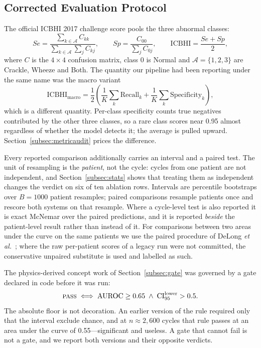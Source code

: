 \documentclass[journal,onecolumn]{IEEEtran}
\begin{document}
\subsection{Corrected Evaluation Protocol}
\label{subsec:protocol}

The official ICBHI 2017 challenge score pools the three abnormal classes:
\begin{equation}
Se = \frac{\sum_{k \in \mathcal{A}} C_{kk}}{\sum_{k \in \mathcal{A}} \sum_{j} C_{kj}},
\qquad
Sp = \frac{C_{00}}{\sum_{j} C_{0j}},
\qquad
\mathrm{ICBHI} = \frac{Se + Sp}{2},
\label{eq:official}
\end{equation}
where $C$ is the $4\times4$ confusion matrix, class 0 is Normal and
$\mathcal{A}=\{1,2,3\}$ are Crackle, Wheeze and Both. The quantity our pipeline
had been reporting under the same name was the macro variant
\begin{equation}
\mathrm{ICBHI}_{\text{macro}} = \frac{1}{2}\left(
\frac{1}{K}\sum_{k} \mathrm{Recall}_k + \frac{1}{K}\sum_{k} \mathrm{Specificity}_k
\right),
\label{eq:macro}
\end{equation}
which is a different quantity. Per-class specificity counts true negatives
contributed by the other three classes, so a rare class scores near 0.95 almost
regardless of whether the model detects it; the average is pulled upward.
Section~\ref{subsec:metricaudit} prices the difference.

Every reported comparison additionally carries an interval and a paired test. The
unit of resampling is the \emph{patient}, not the cycle: cycles from one patient
are not independent, and Section~\ref{subsec:stats} shows that treating them as
independent changes the verdict on six of ten ablation rows. Intervals are
percentile bootstraps over $B=1000$ patient resamples; paired comparisons resample
patients once and rescore both systems on that resample. Where a cycle-level test
is also reported it is exact McNemar over the paired predictions, and it is
reported \emph{beside} the patient-level result rather than instead of it. For
comparisons between two areas under the curve on the same patients we use the
paired procedure of DeLong \emph{et al.}~\cite{delong1988auc}; where the raw
per-patient scores of a legacy run were not committed, the conservative
unpaired substitute is used and labelled as such.

The physics-derived concept work of Section~\ref{subsec:gate} was governed by a
gate declared in code before it was run:
\begin{equation}
\textsc{pass} \iff \mathrm{AUROC} \geq 0.65 \;\wedge\; \mathrm{CI}_{95}^{\text{lower}} > 0.5 .
\label{eq:gate}
\end{equation}
The absolute floor is not decoration. An earlier version of the rule required only
that the interval exclude chance, and at $n\approx2{,}600$ cycles that rule passes
at an area under the curve of 0.55---significant and useless. A gate that cannot
fail is not a gate, and we report both versions and their opposite verdicts.
\end{document}
